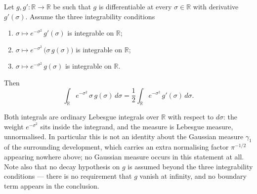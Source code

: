 \begin{lemma}
Let $g, g' : \mathbb{R} \to \mathbb{R}$ be such that $g$ is differentiable at
every $\sigma \in \mathbb{R}$ with derivative $g'(\sigma)$.  Assume the three
integrability conditions
\begin{enumerate}
  \item $\sigma \mapsto e^{-\sigma^2}\, g'(\sigma)$ is integrable on
    $\mathbb{R}$;
  \item $\sigma \mapsto e^{-\sigma^2}\,\bigl(\sigma\, g(\sigma)\bigr)$ is
    integrable on $\mathbb{R}$;
  \item $\sigma \mapsto e^{-\sigma^2}\, g(\sigma)$ is integrable on
    $\mathbb{R}$.
\end{enumerate}
Then
\[
  \int_{\mathbb{R}} e^{-\sigma^2}\,\sigma\, g(\sigma) \, d\sigma
    = \frac{1}{2} \int_{\mathbb{R}} e^{-\sigma^2}\, g'(\sigma) \, d\sigma .
\]

Both integrals are ordinary Lebesgue integrals over $\mathbb{R}$ with respect to
$d\sigma$: the weight $e^{-\sigma^2}$ sits inside the integrand, and the measure
is Lebesgue measure, unnormalised.  In particular this is not an identity about
the Gaussian measure $\gamma_1$ of the surrounding development, which carries an
extra normalising factor $\pi^{-1/2}$ appearing nowhere above; no Gaussian
measure occurs in this statement at all.  Note also that no decay hypothesis on
$g$ is assumed beyond the three integrability conditions --- there is no
requirement that $g$ vanish at infinity, and no boundary term appears in the
conclusion.
\end{lemma}
